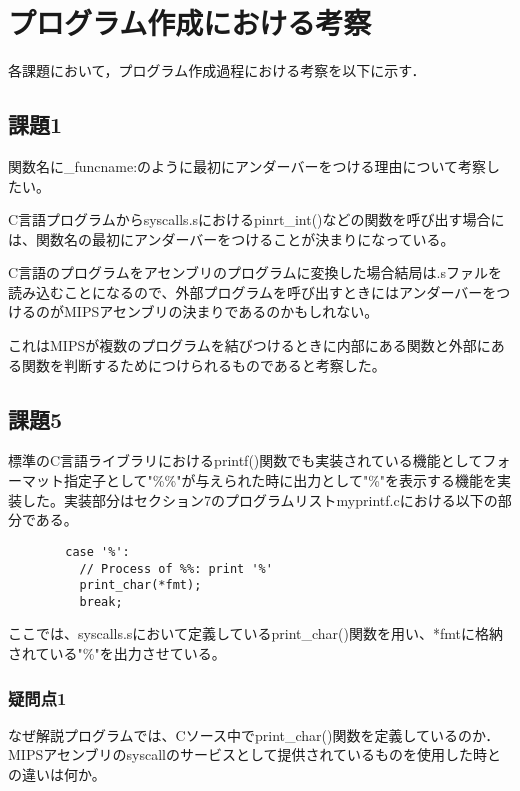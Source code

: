\documentclass[a4j]{jarticle}
\begin{document}
%
%

\section{プログラム作成における考察}

各課題において，プログラム作成過程における考察を以下に示す．

\subsection{課題1}

関数名に\_funcname:のように最初にアンダーバーをつける理由について考察したい。

C言語プログラムからsyscalls.sにおけるpinrt\_int()などの関数を呼び出す場合には、関数名の最初にアンダーバーをつけることが決まりになっている。

C言語のプログラムをアセンブリのプログラムに変換した場合結局は.sファルを読み込むことになるので、外部プログラムを呼び出すときにはアンダーバーをつけるのがMIPSアセンブリの決まりであるのかもしれない。

これはMIPSが複数のプログラムを結びつけるときに内部にある関数と外部にある関数を判断するためにつけられるものであると考察した。


\subsection{課題5}

標準のC言語ライブラリにおけるprintf()関数でも実装されている機能としてフォーマット指定子として"\%\%"が与えられた時に出力として"\%"を表示する機能を実装した。実装部分はセクション7のプログラムリストmyprintf.cにおける以下の部分である。

\begin{verbatim}
        case '%':
          // Process of %%: print '%'
          print_char(*fmt);
          break;
\end{verbatim}

ここでは、syscalls.sにおいて定義しているprint\_char()関数を用い、*fmtに格納されている"\%"を出力させている。

\subsubsection{疑問点1}

なぜ解説プログラムでは、Cソース中でprint\_char()関数を定義しているのか．MIPSアセンブリのsyscallのサービスとして提供されているものを使用した時との違いは何か。
\end{document}

